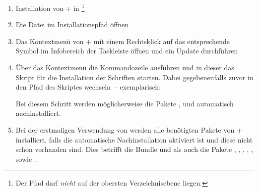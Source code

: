 \begin{enumerate}
\item Installation von \MiKTeX+ in 
  \footnote{%
    Der Pfad darf \emph{nicht} auf der obersten Verzeichnisebene 
     liegen.%
  }
\item Die Datei  im Installationspfad öffnen
\item Das Kontextmenü von \MiKTeX+ mit einem Rechtsklick auf das entsprechende 
  Symbol im Infobereich der Taskleiste öffnen und ein Update durchführen
\item Über das Kontextmenü die Kommandozeile ausführen und in dieser das Skript 
  für die Installation der Schriften  starten.
  Dabei gegebenenfalls zuvor in den Pfad des Skriptes wechseln~-- exemplarisch:
  \begin{quoting}
  \RET*%
  \RET
  \end{quoting}
  Bei diesem Schritt werden möglicherweise die Pakete , 
   und  automatisch nachinstalliert.
\item Bei der erstmaligen Verwendung von \TUDScript werden alle benötigten 
  Pakete von \MiKTeX+ installiert, falls die automatische Nachinstallation 
  aktiviert ist und diese nicht schon vorhanden sind. Dies betrifft die Bundle 
   und  als auch die Pakete 
  , , , 
  , ,  sowie 
  .
\end{enumerate}
%
%
